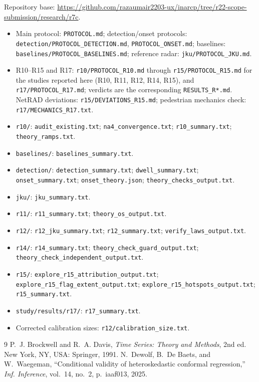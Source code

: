 \documentclass[10pt]{article}
\begin{document}
\noindent Repository base: \url{https://github.com/razaumair2203-ux/inarcp/tree/r22-scope-submission/research/r7c}.
\begin{itemize}\setlength{\itemsep}{1pt}\setlength{\parsep}{0pt}\setlength{\topsep}{4pt}
\item Main protocol: \texttt{PROTOCOL.md}; detection/onset protocols: \texttt{detection/PROTOCOL\_DETECTION.md}, \texttt{PROTOCOL\_ONSET.md}; baselines: \texttt{baselines/PROTOCOL\_BASELINES.md}; reference radar: \texttt{jku/PROTOCOL\_JKU.md}.
\item R10--R15 and R17: \texttt{r10/PROTOCOL\_R10.md} through \texttt{r15/PROTOCOL\_R15.md} for the studies reported here (R10, R11, R12, R14, R15), and \texttt{r17/PROTOCOL\_R17.md}; verdicts are the corresponding \texttt{RESULTS\_R*.md}. NetRAD deviations: \texttt{r15/DEVIATIONS\_R15.md}; pedestrian mechanics check: \texttt{r17/MECHANICS\_R17.txt}.

\item \texttt{r10/}: \texttt{audit\_existing.txt}; \texttt{na4\_convergence.txt}; \texttt{r10\_summary.txt}; \texttt{theory\_ramps.txt}.
\item \texttt{baselines/}: \texttt{baselines\_summary.txt}.
\item \texttt{detection/}: \texttt{detection\_summary.txt}; \texttt{dwell\_summary.txt}; \texttt{onset\_summary.txt}; \texttt{onset\_theory.json}; \texttt{theory\_checks\_output.txt}.
\item \texttt{jku/}: \texttt{jku\_summary.txt}.
\item \texttt{r11/}: \texttt{r11\_summary.txt}; \texttt{theory\_os\_output.txt}.
\item \texttt{r12/}: \texttt{r12\_jku\_summary.txt}; \texttt{r12\_summary.txt}; \texttt{verify\_laws\_output.txt}.
\item \texttt{r14/}: \texttt{r14\_summary.txt}; \texttt{theory\_check\_guard\_output.txt}; \texttt{theory\_check\_independent\_output.txt}.
\item \texttt{r15/}: \texttt{explore\_r15\_attribution\_output.txt}; \texttt{explore\_r15\_flag\_extent\_output.txt}; \texttt{explore\_r15\_hotspots\_output.txt}; \texttt{r15\_summary.txt}.
\item \texttt{study/results/r17/}: \texttt{r17\_summary.txt}.
\item Corrected calibration sizes: \texttt{r12/calibration\_size.txt}.
\end{itemize}
\begin{thebibliography}{9}
 P.~J. Brockwell and R.~A. Davis, \emph{Time Series: Theory and Methods}, 2nd ed. New York, NY, USA: Springer, 1991.
 N.~Dewolf, B.~De Baets, and W.~Waegeman, ``Conditional validity of heteroskedastic conformal regression,'' \emph{Inf. Inference}, vol.~14, no.~2, p.~iaaf013, 2025.
\end{thebibliography}
\end{document}
